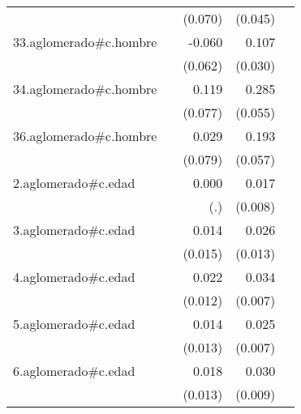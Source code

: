 {\begin{longtable}{l*{4}{D{.}{.}{-1}}}
            &                     &     (0.070)         &     (0.045)         &                     \\
\addlinespace
33.aglomerado#c.hombre&                     &      -0.060         &       0.107\sym{***}&                     \\
            &                     &     (0.062)         &     (0.030)         &                     \\
\addlinespace
34.aglomerado#c.hombre&                     &       0.119         &       0.285\sym{***}&                     \\
            &                     &     (0.077)         &     (0.055)         &                     \\
\addlinespace
36.aglomerado#c.hombre&                     &       0.029         &       0.193\sym{***}&                     \\
            &                     &     (0.079)         &     (0.057)         &                     \\
\addlinespace
2.aglomerado#c.edad&                     &       0.000         &       0.017\sym{*}  &                     \\
            &                     &         (.)         &     (0.008)         &                     \\
\addlinespace
3.aglomerado#c.edad&                     &       0.014         &       0.026\sym{*}  &                     \\
            &                     &     (0.015)         &     (0.013)         &                     \\
\addlinespace
4.aglomerado#c.edad&                     &       0.022         &       0.034\sym{***}&                     \\
            &                     &     (0.012)         &     (0.007)         &                     \\
\addlinespace
5.aglomerado#c.edad&                     &       0.014         &       0.025\sym{***}&                     \\
            &                     &     (0.013)         &     (0.007)         &                     \\
\addlinespace
6.aglomerado#c.edad&                     &       0.018         &       0.030\sym{**} &                     \\
            &                     &     (0.013)         &     (0.009)         &                     \\

\end{longtable}}
